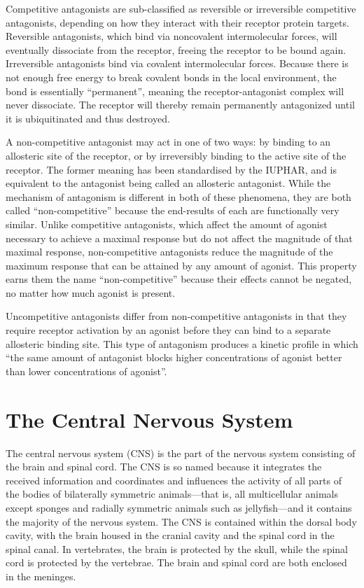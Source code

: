 \documentclass[]{book}
\begin{document}
Competitive antagonists are sub-classified as reversible or irreversible competitive antagonists, depending on how they interact with their receptor protein targets. Reversible antagonists, which bind via noncovalent intermolecular forces, will eventually dissociate from the receptor, freeing the receptor to be bound again. Irreversible antagonists bind via covalent intermolecular forces. Because there is not enough free energy to break covalent bonds in the local environment, the bond is essentially ``permanent'', meaning the receptor-antagonist complex will never dissociate. The receptor will thereby remain permanently antagonized until it is ubiquitinated and thus destroyed.

A non-competitive antagonist may act in one of two ways: by binding to an allosteric site of the receptor, or by irreversibly binding to the active site of the receptor. The former meaning has been standardised by the IUPHAR, and is equivalent to the antagonist being called an allosteric antagonist. While the mechanism of antagonism is different in both of these phenomena, they are both called ``non-competitive'' because the end-results of each are functionally very similar. Unlike competitive antagonists, which affect the amount of agonist necessary to achieve a maximal response but do not affect the magnitude of that maximal response, non-competitive antagonists reduce the magnitude of the maximum response that can be attained by any amount of agonist. This property earns them the name ``non-competitive'' because their effects cannot be negated, no matter how much agonist is present.

Uncompetitive antagonists differ from non-competitive antagonists in that they require receptor activation by an agonist before they can bind to a separate allosteric binding site. This type of antagonism produces a kinetic profile in which ``the same amount of antagonist blocks higher concentrations of agonist better than lower concentrations of agonist''.

\hypertarget{the-central-nervous-system}{%
\chapter{The Central Nervous System}\label{the-central-nervous-system}}

The central nervous system (CNS) is the part of the nervous system consisting of the brain and spinal cord. The CNS is so named because it integrates the received information and coordinates and influences the activity of all parts of the bodies of bilaterally symmetric animals---that is, all multicellular animals except sponges and radially symmetric animals such as jellyfish---and it contains the majority of the nervous system. The CNS is contained within the dorsal body cavity, with the brain housed in the cranial cavity and the spinal cord in the spinal canal. In vertebrates, the brain is protected by the skull, while the spinal cord is protected by the vertebrae. The brain and spinal cord are both enclosed in the meninges.
\end{document}
